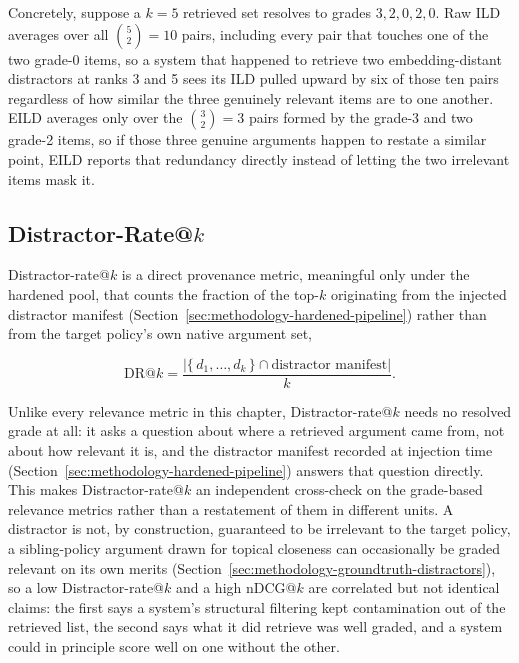 Concretely, suppose a $k=5$ retrieved set resolves to grades $3, 2, 0, 2, 0$. Raw ILD averages over
all $\binom{5}{2}=10$ pairs, including every pair that touches one of the two grade-0 items, so a
system that happened to retrieve two embedding-distant distractors at ranks 3 and 5 sees its ILD
pulled upward by six of those ten pairs regardless of how similar the three genuinely relevant items
are to one another. EILD averages only over the $\binom{3}{2}=3$ pairs formed by the grade-3 and
two grade-2 items, so if those three genuine arguments happen to restate a similar point, EILD
reports that redundancy directly instead of letting the two irrelevant items mask it.

\subsection{Distractor-Rate@$k$}
\label{sec:evaluation-uc1-distractorrate}

Distractor-rate@$k$ is a direct provenance metric, meaningful only under the hardened pool, that
counts the fraction of the top-$k$ originating from the injected distractor manifest
(Section~\ref{sec:methodology-hardened-pipeline}) rather than from the target policy's own native
argument set,

\begin{equation}
\mathrm{DR}@k = \frac{\left| \{\,d_1,\dots,d_k\,\} \cap \text{distractor manifest} \right|}{k}.
\label{eq:evaluation-distractorrate}
\end{equation}

\noindent Unlike every relevance metric in this chapter, Distractor-rate@$k$ needs no resolved
grade at all: it asks a question about where a retrieved argument came from, not about how relevant
it is, and the distractor manifest recorded at injection time (Section~\ref{sec:methodology-hardened-pipeline})
answers that question directly. This makes Distractor-rate@$k$ an independent cross-check on the
grade-based relevance metrics rather than a restatement of them in different units. A distractor is
not, by construction, guaranteed to be irrelevant to the target policy, a sibling-policy argument
drawn for topical closeness can occasionally be graded relevant on its own merits
(Section~\ref{sec:methodology-groundtruth-distractors}), so a low Distractor-rate@$k$ and a high
nDCG@$k$ are correlated but not identical claims: the first says a system's structural filtering
kept contamination out of the retrieved list, the second says what it did retrieve was well graded,
and a system could in principle score well on one without the other.

